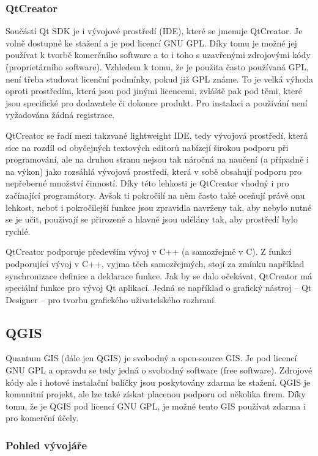 \documentclass[a4paper,10pt]{article}
\begin{document}
\subsubsection{QtCreator}
Součástí Qt SDK je i vývojové prostředí (IDE), které se jmenuje QtCreator.
Je volně dostupné ke stažení a je pod licencí GNU GPL.
Díky tomu je možné jej používat k tvorbě komerčního software a to i toho s uzavřenými zdrojovými kódy (proprietárního software).
Vzhledem k tomu, že je použita často používaná GPL, není třeba studovat licenční podmínky, pokud již GPL známe.
To je velká výhoda oproti prostředím, která jsou pod jinými licencemi, zvláště pak pod těmi, které jsou specifické pro dodavatele či dokonce produkt.
Pro instalaci a používání není vyžadována žádná registrace.

QtCreator se řadí mezi takzvané lightweight IDE, tedy vývojová prostředí, která sice na rozdíl od obyčejných textových editorů nabízejí širokou podporu při programování,
ale na druhou stranu nejsou tak náročná na naučení (a případně i na výkon) jako rozsáhlá vývojová prostředí, která v sobě obsahují podporu pro nepřeberné množství činností.
Díky této lehkosti je QtCreator vhodný i pro začínající programátory.
Avšak ti pokročilí na něm často také oceňují právě onu lehkost, neboť i pokročilejší funkce jsou zpravidla navrženy tak,
aby nebylo nutné se je učit, používají se přirozeně a hlavně jsou udělány tak, aby prostředí bylo rychlé.

QtCreator podporuje především vývoj v C++ (a samozřejmě v C).
Z funkcí podporující vývoj v C++, vyjma těch samozřejmých, stojí za zmínku například synchronizace definice a deklarace funkce.
Jak by se dalo očekávat, QtCreator má speciální funkce pro vývoj Qt aplikací.
Jedná se například o grafický nástroj -- Qt Designer -- pro tvorbu grafického uživatelského rozhraní.

\subsection{QGIS}
Quantum GIS (dále jen QGIS) je svobodný a open-source GIS.
Je pod licencí GNU GPL a opravdu se tedy jedná o svobodný software (free software).
Zdrojové kódy ale i hotové instalační balíčky jsou poskytovány zdarma ke stažení.
QGIS je komunitní projekt, ale lze také získat placenou podporu od několika firem.
Díky tomu, že je QGIS pod licencí GNU GPL, je možné tento GIS používat zdarma i pro komerční účely.

\subsubsection{Pohled vývojáře}
\end{document}
